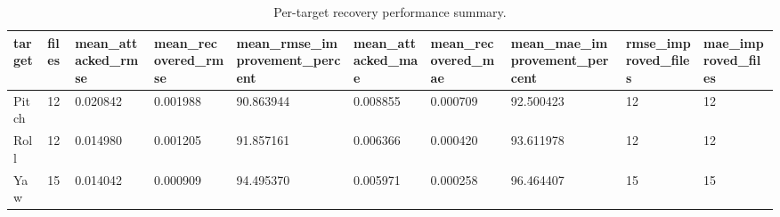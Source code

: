 \begin{table}[t]
\centering
\caption{Per-target recovery performance summary.}
\label{tab:phase6_per_target_metrics}
\begin{tabular}{llllllllll}
\hline
target & files & mean\_attacked\_rmse & mean\_recovered\_rmse & mean\_rmse\_improvement\_percent & mean\_attacked\_mae & mean\_recovered\_mae & mean\_mae\_improvement\_percent & rmse\_improved\_files & mae\_improved\_files \\
\hline
Pitch & 12 & 0.020842 & 0.001988 & 90.863944 & 0.008855 & 0.000709 & 92.500423 & 12 & 12 \\
Roll & 12 & 0.014980 & 0.001205 & 91.857161 & 0.006366 & 0.000420 & 93.611978 & 12 & 12 \\
Yaw & 15 & 0.014042 & 0.000909 & 94.495370 & 0.005971 & 0.000258 & 96.464407 & 15 & 15 \\
\hline
\end{tabular}
\end{table}
